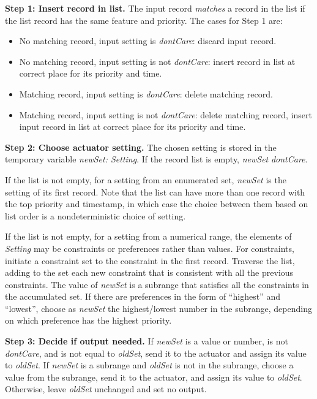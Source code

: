 \documentclass[conference]{IEEEtran}
\begin{document}
\vspace{2mm}
{\bf Step 1: Insert record in list.}
The input record {\it matches} a record in the list if the list record
has the same feature and priority.
The cases for Step 1 are:
\begin{itemize}
\item
No matching record, input setting is {\it dontCare}: discard input record.
\item
No matching record, input setting is not {\it dontCare}: 
insert record in list at correct place for its priority and time.
\item
Matching record, input setting is {\it dontCare}: delete matching record.
\item
Matching record, input setting is not {\it dontCare}: delete matching
record, insert input record in list at correct place for its priority
and time.
\end{itemize}

\vspace{2mm}
{\bf Step 2: Choose actuator setting.}  The chosen setting is stored in
the temporary variable {\it newSet: Setting}. 
If the record list is empty, {\it newSet}  {\it dontCare}.

If the list is not empty,
for a setting from an enumerated set,
{\it newSet} is the setting of its first record.
Note that the list can have more than one record with the top priority
and timestamp, in which case the choice between them based on
list order is a nondeterministic choice of setting.

If the list is not empty, for a setting from a numerical range,
the elements of {\it Setting} may be constraints or preferences
rather than values.
For constraints,
initiate a constraint set to the constraint in the first
record.
Traverse the list, adding to the set each new constraint that is 
consistent with all the previous constraints.  
The value of {\it newSet} is a subrange that satisfies all the
constraints in the accumulated set.
If there are preferences in the form of ``highest'' and ``lowest'', 
choose as {\it newSet} the highest/lowest number in the subrange,
depending on which preference has the highest priority.

\vspace{2mm}
{\bf Step 3: Decide if output needed.}  
If {\it newSet} is a value or number, is not {\it dontCare},
and is not equal to {\it oldSet},
send it to the actuator and assign its value to {\it oldSet}.
If {\it newSet} is a subrange and {\it oldSet} is not in the
subrange, choose a value from the subrange, send it to the actuator,
and assign its value to {\it oldSet}.
Otherwise, leave {\it oldSet} unchanged and set no output.
\end{document}
